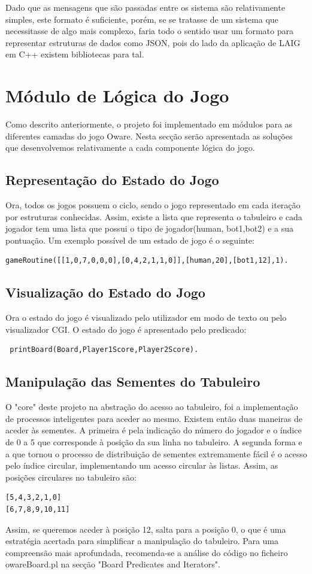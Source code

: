 \documentclass[15pt,a4paper]{article}
\begin{document}
Dado que as mensagens que são passadas entre os sistema são relativamente simples, este formato é suficiente, porém, se se tratasse de um sistema que necessitasse de algo mais complexo, faria todo o sentido usar um formato para representar estruturas de dados como JSON, pois do lado da aplicação de LAIG em C++ existem bibliotecas para tal.

\section{Módulo de Lógica do Jogo}
Como descrito anteriormente, o projeto foi implementado em módulos para as diferentes camadas do jogo Oware. Nesta secção serão apresentada as soluções que desenvolvemos relativamente a cada componente lógica do jogo.

\subsection{Representação do Estado do Jogo}
Ora, todos os jogos possuem o ciclo, sendo o jogo representado em cada iteração por estruturas conhecidas. Assim, existe a lista que representa o tabuleiro e cada jogador tem uma lista que possui o tipo de jogador(human, bot1,bot2) e a sua pontuação. Um exemplo possível de um estado de jogo é o seguinte:
\begin{verbatim}
gameRoutine([[1,0,7,0,0,0],[0,4,2,1,1,0]],[human,20],[bot1,12],1).
\end{verbatim}

\subsection{Visualização do Estado do Jogo}
Ora o estado do jogo é visualizado pelo utilizador em modo de texto ou pelo visualizador CGI. O estado do jogo é apresentado pelo predicado:
\begin{verbatim}
 printBoard(Board,Player1Score,Player2Score).
\end{verbatim}


\subsection{Manipulação das Sementes do Tabuleiro}
O "core" deste projeto na abstração do acesso ao tabuleiro, foi a implementação de processos inteligentes para aceder ao mesmo. Existem então duas maneiras de aceder às sementes. A primeira é pela indicação do número do jogador e o índice de 0 a 5 que corresponde à posição da sua linha no tabuleiro. A segunda forma e a que tornou o processo de distribuição de sementes extremamente fácil é o acesso pelo índice circular, implementando um acesso circular às listas. Assim, as posições circulares no tabuleiro são:
\begin{verbatim}
[5,4,3,2,1,0]
[6,7,8,9,10,11]
\end{verbatim}
Assim, se queremos aceder à posição 12, salta para a posição 0, o que é uma estratégia acertada para simplificar a manipulação do tabuleiro. Para uma compreensão mais aprofundada, recomenda-se a análise do código no ficheiro owareBoard.pl na secção "Board Predicates and Iterators". 
\end{document}
